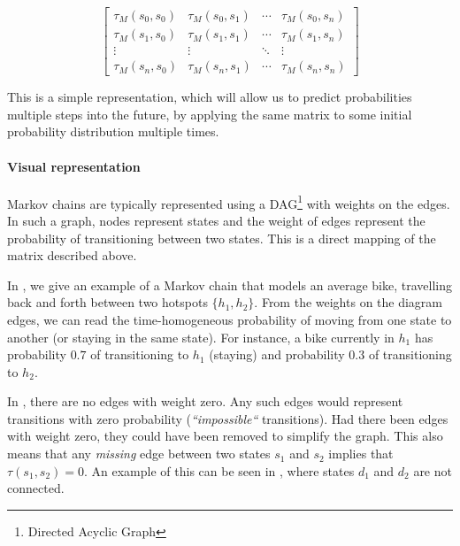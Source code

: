 \begin{equation}\label{markov:matrix}
\begin{bmatrix}
\tau_M(s_0, s_0) & \tau_M(s_0, s_1) & \cdots & \tau_M(s_0, s_n)\\
\tau_M(s_1, s_0) & \tau_M(s_1, s_1) & \cdots & \tau_M(s_1, s_n)\\
\vdots & \vdots & \ddots & \vdots\\
\tau_M(s_n, s_0) & \tau_M(s_n, s_1) & \cdots & \tau_M(s_n, s_n)
\end{bmatrix}
\end{equation}

This is a simple representation, which will allow us to predict probabilities multiple steps into the future, by applying the same matrix to some initial probability distribution multiple times.

\paragraph{Visual representation}
Markov chains are typically represented using a DAG\footnote{Directed Acyclic Graph} with weights on the edges.
In such a graph, nodes represent states and the weight of edges represent the probability of transitioning between two states.
This is a direct mapping of the matrix described above.

In , we give an example of a Markov chain that models an average bike, travelling back and forth between two hotspots $\{h_1, h_2\}$.
From the weights on the diagram edges, we can read the time-homogeneous probability of moving from one state to another (or staying in the same state).
For instance, a bike currently in $h_1$ has probability $0.7$ of transitioning to $h_1$ (staying) and probability $0.3$ of transitioning to $h_2$.



In , there are no edges with weight zero.
Any such edges would represent transitions with zero probability (\textit{``impossible``} transitions).
Had there been edges with weight zero, they could have been removed to simplify the graph.
This also means that any \textit{missing} edge between two states $s_1$ and $s_2$ implies that $\tau(s_1, s_2) = 0$.
An example of this can be seen in , where states $d_1$ and $d_2$ are not connected.

